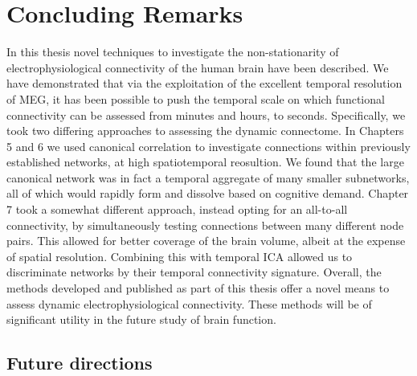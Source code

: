 \chapter{Concluding Remarks}

In this thesis novel techniques to investigate the non-stationarity of electrophysiological connectivity of the human brain have been described. We have demonstrated that via the exploitation of the excellent temporal resolution of MEG, it has been possible to push the temporal scale on which functional connectivity can be assessed from minutes and hours, to seconds. Specifically, we took two differing approaches to assessing the dynamic connectome. In Chapters 5 and 6 we used canonical correlation to investigate connections within previously established networks, at high spatiotemporal reosultion. We found that the large canonical network was in fact a temporal aggregate of many smaller subnetworks, all of which would rapidly form and dissolve based on cognitive demand. Chapter 7 took a somewhat different approach, instead opting for an all-to-all connectivity, by simultaneously testing connections between many different node pairs. This allowed for better coverage of the brain volume, albeit at the expense of spatial resolution. Combining this with temporal ICA allowed us to discriminate networks by their temporal connectivity signature. Overall, the methods developed and published as part of this thesis offer a novel means to assess dynamic electrophysiological connectivity. These methods will be of significant utility in the future study of brain function.

\section{Future directions}

